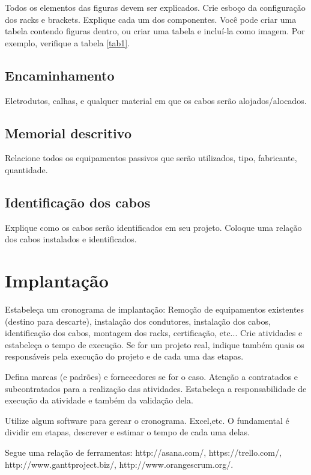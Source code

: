 \documentclass[	DIV=calc,%
paper=a4,%
fontsize=12pt,%
onecolumn]{scrartcl}	 					%
\begin{document}
	Todos os elementos das figuras devem ser explicados. 
	Crie esboço da configuração dos racks e brackets. Explique cada um dos componentes. Você pode criar uma tabela contendo figuras dentro, ou criar uma tabela e incluí-la como imagem. Por exemplo, verifique a tabela \ref{tab1}.
	
	
	
	\subsection{Encaminhamento}
	Eletrodutos, calhas, e qualquer material em que os cabos serão alojados/alocados.
	
	\subsection{Memorial descritivo}
	
	Relacione todos os equipamentos passivos que serão utilizados, tipo, fabricante, quantidade.
	
	\subsection{Identificação dos cabos}
	Explique como os cabos serão identificados em seu projeto. Coloque uma relação dos cabos instalados e identificados.
	
	\section{Implantação}
	Estabeleça um cronograma de implantação:
	Remoção de equipamentos existentes (destino para descarte), instalação dos condutores, instalação dos cabos, 
	identificação dos cabos, montagem dos racks, certificação, etc... Crie atividades e estabeleça o tempo de execução. Se for um projeto real, indique também quais os responsáveis pela execução do projeto e de cada uma das etapas.
	
	Defina marcas (e padrões) e fornecedores se for o caso. Atenção a contratados e subcontratados para a realização das atividades. Estabeleça a responsabilidade de execução da atividade e também da validação dela.
	
	Utilize algum software para gerear o cronograma. Excel,etc. O fundamental é dividir em etapas, descrever e estimar o tempo de cada uma delas.
	
	Segue uma relação de ferramentas:
	http://asana.com/, 
	https://trello.com/, 
	http://www.ganttproject.biz/, 
	http://www.orangescrum.org/. 
	
\end{document}
